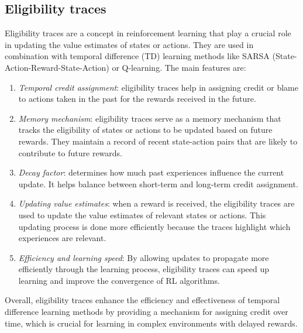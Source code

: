 \subsection{Eligibility traces}
Eligibility traces are a concept in reinforcement learning that play a crucial role in updating the value estimates of states or actions. 
They are used in combination with temporal difference (TD) learning methods like SARSA (State-Action-Reward-State-Action) or Q-learning.
The main features are:
\begin{enumerate}
    \item \textit{Temporal credit assignment}: eligibility traces help in assigning credit or blame to actions taken in the past for the rewards received in the future.
    \item \textit{Memory mechanism}: eligibility traces serve as a memory mechanism that tracks the eligibility of states or actions to be updated based on future rewards. 
        They maintain a record of recent state-action pairs that are likely to contribute to future rewards.
    \item \textit{Decay factor}: determines how much past experiences influence the current update.
        It helps balance between short-term and long-term credit assignment.
    \item \textit{Updating value estimates}: when a reward is received, the eligibility traces are used to update the value estimates of relevant states or actions. 
        This updating process is done more efficiently because the traces highlight which experiences are relevant.
    \item \textit{Efficiency and learning speed}: By allowing updates to propagate more efficiently through the learning process, eligibility traces can speed up learning and improve the convergence of RL algorithms.
\end{enumerate}
Overall, eligibility traces enhance the efficiency and effectiveness of temporal difference learning methods by providing a mechanism for assigning credit over time, which is crucial for learning in complex environments with delayed rewards.